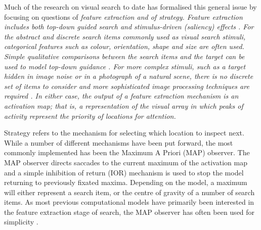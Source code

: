 \documentclass[preprint, authoryear]{elsarticle} %
\begin{document}
Much of the research on visual search to date has formalised this general issue by focusing on questions of  \itshape feature extraction \normalfont  and of \itshape strategy\normalfont. Feature extraction includes both top-down guided search \citep{wolfe2007, zelinsky2008} and stimulus-driven (saliency) effects \citep{itti-koch2000, gao2008, itti-baldi2009}.  For the abstract and discrete search items commonly used as visual search stimuli, categorical features such as colour, orientation, shape and size are often used. Simple qualitative comparisons between the search items and the target can be used to model top-down guidance \citep{pomplun2003, rutishauser-koch2007}. For more complex stimuli, such as a target hidden in image noise or in a photograph of a natural scene, there is no discrete set of items to consider and more sophisticated image processing techniques are required \citep{rao2002, zelinsky2008, pomplun2007,  hwang2009, tavassoli2009}. In either case, the output of a feature extraction mechanism is an activation map; that is, a representation of the visual array in which peaks of activity represent the priority of locations for attention.

\par

Strategy refers to the mechanism for selecting which location to inspect next. While a number of different mechanisms have been put forward, the most commonly implemented has been the Maximum A Priori (MAP) observer. The MAP observer directs saccades to the current maximum of the activation map and a simple inhibition of return (IOR) mechanism is used to stop the model returning to previously fixated maxima. Depending on the model, a maximum will either represent a search item, or the centre of gravity of a number of search items. As most previous computational models have primarily been interested in the feature extraction stage of search, the MAP observer has often been used for simplicity \citep{itti-koch2000, rao2002, pomplun2003, rutishauser-koch2007, clarke2009, zelinsky2008}.
 
 \par
\end{document}
